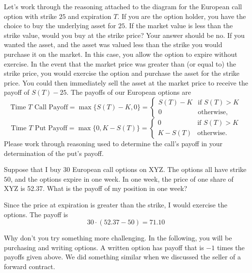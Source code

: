 \documentclass{ximera}
\begin{document}
Let's work through the reasoning attached to the diagram for the European call option with strike $25$ and expiration $T$. If you are the option holder, you have the choice to buy the underlying asset for $25$. If the market value is less than the strike value, would you buy at the strike price? Your answer should be no. If you wanted the asset, and the asset was valued less than the strike you would purchase it on the market. In this case, you allow the option to expire without exercise. In the event that the market price was greater than (or equal to) the strike price, you would exercise the option and purchase the asset for the strike price. You could then immediately sell the asset at the market price to receive the payoff of $S(T)-25$. The payoffs of our European options are
\begin{equation*}
\text{Time $T$ Call Payoff}=\max\{S(T)-K,0\}=
	\begin{cases}
	S(T)-K & \text{if } S(T)> K\\
	0&\text{otherwise,}
	\end{cases}
\end{equation*}
\begin{equation*}
\text{Time $T$ Put Payoff}=\max\{0,K-S(T)\}=
	\begin{cases}
	0 & \text{if }S(T)> K\\
	K-S(T)&\text{otherwise.}
	\end{cases}
\end{equation*}
Please work through reasoning used to determine the call's payoff in your determination of the put's payoff.

\begin{example}
Suppose that I buy 30 European call options on XYZ. The options all have strike $50$, and the options expire in one week. In one week, the price of one share of XYZ is 52.37. What is the payoff of my position in one week?
\end{example}

\begin{solution}
Since the price at expiration is greater than the strike, I would exercise the options. The payoff is
	\begin{equation*}
	30\cdot(52.37-50)=71.10
	\end{equation*}
\end{solution}

Why don't you try something more challenging. In the following, you will be purchasing and writing options. A written option has payoff that is $-1$ times the payoffs given above. We did something similar when we discussed the seller of a forward contract.
\end{document}
